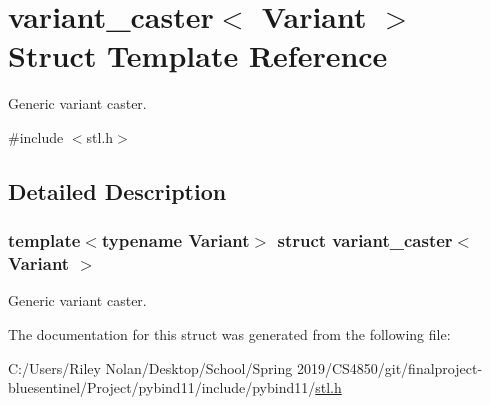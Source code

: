 \hypertarget{structvariant__caster}{}\section{variant\+\_\+caster$<$ Variant $>$ Struct Template Reference}
\label{structvariant__caster}


Generic variant caster.  




{\ttfamily \#include $<$stl.\+h$>$}



\subsection{Detailed Description}
\subsubsection*{template$<$typename Variant$>$\newline
struct variant\+\_\+caster$<$ Variant $>$}

Generic variant caster. 

The documentation for this struct was generated from the following file\+:\begin{DoxyCompactItemize}
\item 
C\+:/\+Users/\+Riley Nolan/\+Desktop/\+School/\+Spring 2019/\+C\+S4850/git/finalproject-\/bluesentinel/\+Project/pybind11/include/pybind11/\mbox{\hyperlink{stl_8h}{stl.\+h}}\end{DoxyCompactItemize}
